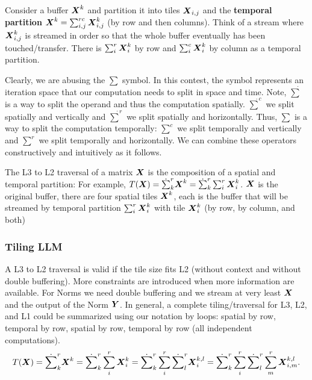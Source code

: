 \documentclass[acmsmall]{acmart}
\begin{document}
\begin{definition}
  Consider a buffer ${\boldsymbol X}^k$ and partition it into tiles
  ${\boldsymbol X}_{i,j}$ and the {\bf temporal partition} ${\boldsymbol X}^k =
  \sum_{i,j}^{rc}{\boldsymbol X}^k_{i,j}$ (by row and then columns). Think of a
  stream where ${\boldsymbol X}^k_{i,j}$ is streamed in order so that the whole
  buffer eventually has been touched/transfer. There is
  $\sum_{i}^r{\boldsymbol X}^k_{i}$ by row and $\sum_{i}^c{\boldsymbol X}^k_{i}$ by
  column as a temporal partition.
\end{definition}

Clearly, we are abusing the $\sum$ symbol. In this contest, the symbol
represents an iteration space that our computation needs to split in
space and time. Note, $\dot\sum$ is a way to split the operand and
thus the computation spatially.  $\dot\sum^c$ we split spatially and
vertically and $\dot\sum^r$ we split spatially and horizontally.
Thus, $\sum$ is a way to split the computation temporally: $\sum^c$ we
split temporally and vertically and $\sum^r$ we split temporally and
horizontally. We can combine these operators constructively and
intuitively as it follows.

\begin{definition}
  The L3 to L2 traversal of a matrix ${\boldsymbol X}$ is the composition of a
  spatial and temporal partition: For example, $T({\boldsymbol X}) =
  \dot\sum_k^r {\boldsymbol X}^k = \dot\sum_k^r\sum_{i}^{r}{\boldsymbol X}^k_{i}$.
  ${\boldsymbol X}$ is the original buffer, there are four spatial tiles
  ${\boldsymbol X}^k$, each is the buffer that will be streamed by temporal
  partition $\sum_{i}^r{\boldsymbol X}^k_{i}$ with tile ${\boldsymbol X}^k_{i}$ (by row,
  by column, and both)
\end{definition}

\subsubsection{Tiling LLM}
A L3 to L2 traversal is valid if the tile size fits L2 (without
context and without double buffering). More constraints are introduced
when more information are available. For Norms we need double
buffering and we stream at very least ${\boldsymbol X}$ and the output of the
Norm ${\boldsymbol Y}$. In general, a complete tiling/traversal for L3, L2, and
L1 could be summarized using our notation by loops: spatial by row,
temporal by row, spatial by row, temporal by row (all independent
computations).
\begin{equation}
T({\boldsymbol X}) = \dot\sum_k^r {\boldsymbol X}^k =
\dot\sum_k^r\sum_{i}^{r}{\boldsymbol X}^k_{i} =
\dot\sum_k^r\sum_{i}^{r}\dot\sum_l^r{\boldsymbol X}^{k,l}_{i} =
\dot\sum_k^r\sum_{i}^r\dot\sum_l^r\sum_{m}^r{\boldsymbol X}^{k,l}_{i,m}.
\end{equation}
\end{document}
